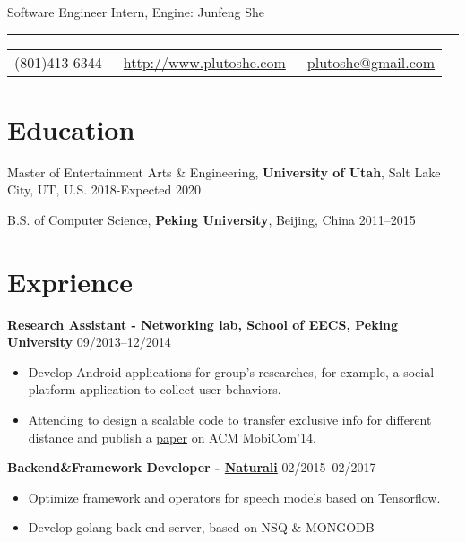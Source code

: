 \documentclass{article}
\begin{document}
	
	\color{text1} %
	
	\par{\centering
		{\sffamily\huge Software Engineer Intern, Engine: Junfeng She
		}\\	
		{\color{headings} \par}
		{\color{white} \hrule} %
		
		\vspace{10pt}
		
		\colorbox{mygrey}{\textcolor{text1}{
				\begin{tabular}{c|c|c}
					\raisebox{-2pt}{\Phone} (801)413-6344 &
					\raisebox{-2pt}{\Envelope} ~\href{http://www.plutoshe.com}{http://www.plutoshe.com}	 &	 \raisebox{0pt}{\textbf{@}}
					~\href{mailto:plutoshe@gmail.com}{plutoshe@gmail.com}
				\end{tabular}
			}
		}
		\vspace{10pt}
		
		\section{Education}
		\vspace{5pt}
		Master of Entertainment Arts \& Engineering, \textbf{University of Utah}, Salt Lake City, UT, U.S. \hfill 2018-Expected 2020
		\vspace{5pt}
		
		B.S. of Computer Science, \textbf{Peking University}, Beijing, China \hfill 2011--2015
		\vspace{10pt}
		
		\section{Exprience}
		\textbf{Research Assistant - \href{http://net.pku.edu.cn/mobile/doku.php?id=eng:start}{Networking lab, School of EECS, Peking University}} \hfill 09/2013--12/2014
			\begin{itemize}
				\item Develop Android applications for group's researches, for example, a social platform application to collect user behaviors.
				\item Attending to design a scalable code to transfer exclusive info for different distance and publish a \href{https://www.eng.yale.edu/wenjun/papers/strata.pdf}{paper} on ACM MobiCom'14.
			\end{itemize}
		\textbf{Backend\&Framework Developer - \href{https://naturali.io}{Naturali}} \hfill 02/2015--02/2017
		\begin{itemize}
			\item Optimize framework and operators for speech models based on Tensorflow.
			\item Develop golang back-end server, based on NSQ \& MONGODB
		\end{itemize}
		
}
\end{document}

